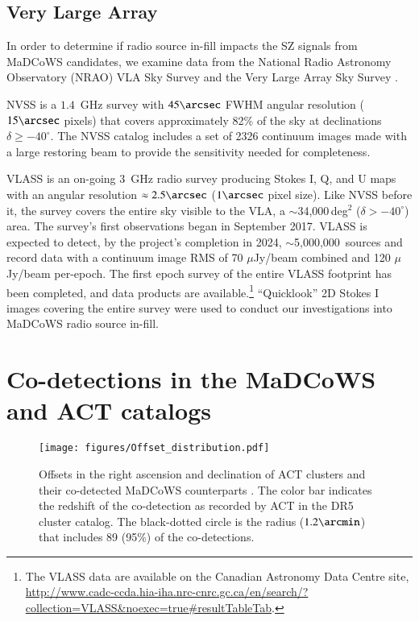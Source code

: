 \documentclass[longauth]{aa} %
\begin{document}
\subsection{Very Large Array}\label{sec:data:vla}

In order to determine if radio source in-fill impacts the SZ signals from MaDCoWS candidates, we examine data from the National Radio Astronomy Observatory (NRAO) VLA Sky Survey \citep[NVSS;][]{Condon1998} and the Very Large Array Sky Survey \citep[VLASS;][]{Lacy2020}. 

NVSS is a $1.4$~GHz survey with $45\arcsec$ FWHM angular resolution ($15\arcsec$ pixels) that covers approximately 82\% of the sky at declinations $\delta \geq -40 ^\circ$. The NVSS catalog includes a set of 2326 continuum images made with a large restoring beam to provide the sensitivity needed for completeness. 

VLASS is an on-going $3$~GHz radio survey producing Stokes I, Q, and U maps with an angular resolution $\approx2.5\arcsec$ ($1\arcsec$ pixel size). Like NVSS before it, the survey covers the entire sky visible to the VLA, a $\sim$34,000\,deg$^2$ ($\delta > -40^\circ$) area. The survey's first observations began in September 2017. VLASS is expected to detect, by the project's completion in 2024, $\sim$5,000,000\ sources and record data with a continuum image RMS of 70 $\mu$Jy/beam combined and 120 $\mu$Jy/beam per-epoch. The first epoch survey of the entire VLASS footprint has been completed, and data products are available.\footnote{The VLASS data are available on the Canadian Astronomy Data Centre site, \href{http://www.cadc-ccda.hia-iha.nrc-cnrc.gc.ca/en/search/?collection=VLASS&noexec=true\#resultTableTab}{http://www.cadc-ccda.hia-iha.nrc-cnrc.gc.ca/en/search/?collection=VLASS\&noexec=true\#resultTableTab}.} ``Quicklook'' 2D Stokes I images covering the entire survey were used to conduct our investigations into MaDCoWS radio source in-fill.



\section{Co-detections in the MaDCoWS and ACT catalogs}\label{sec:crossmatches}

\begin{figure}
    \centering
    \texttt{[image: figures/Offset\_distribution.pdf]}
    \caption{Offsets in the right ascension and declination of ACT clusters \citep{Hilton2021} and their co-detected MaDCoWS counterparts \citep{Gonzalez2019catalog}. The color bar indicates the redshift of the co-detection as recorded by ACT in the DR5 cluster catalog. The black-dotted circle is the radius ($1.2\arcmin$) that includes 89 (95\%) of the co-detections. }
    \label{fig:Offsets}
\end{figure}
\end{document}
